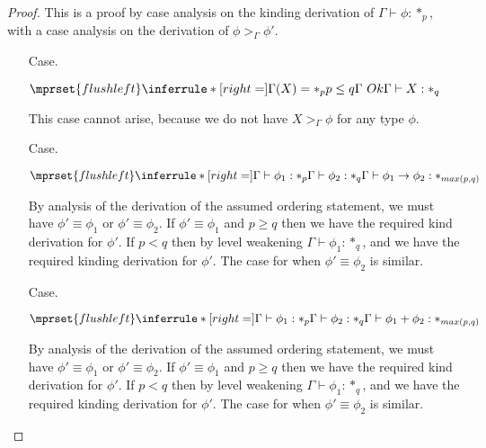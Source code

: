 \begin{proof}
  This is a proof by case analysis on the kinding derivation of 
$\Gamma \vdash \phi:*_p$, with a case analysis on the derivation of 
$\phi >_\Gamma \phi'$.\\

\begin{itemize}
\item[Case.]\ \\
  \begin{center}
    \begin{math}
      $$\mprset{flushleft}
      \inferrule* [right=] {
        \Gamma(X) = *_p
	\\
	p \leq q
	\\
	\Gamma\ Ok
      }{\Gamma \vdash X : *_q}
    \end{math}
  \end{center}
  This case cannot arise, because we do not have $X >_\Gamma \phi$ for any type 
  $\phi$.\\
  
\item[Case.]\ \\
  \begin{center}
    \begin{math}
      $$\mprset{flushleft}
      \inferrule* [right=] {
        \Gamma \vdash \phi_1 : *_p
	\\
	\Gamma \vdash \phi_2 : *_q
      }{\Gamma \vdash \phi_1 \rightarrow \phi_2 : *_{max(p,q)}}
    \end{math}
  \end{center}
  By analysis of the derivation of the assumed ordering statement, we must have 
  $\phi' \equiv \phi_1$ or $\phi' \equiv \phi_2$.  If $\phi' \equiv \phi_1$ and 
  $p \geq q$ then we have the required kind derivation for $\phi'$. If $p < q$ then by 
  level weakening $\Gamma \vdash \phi_1:*_q$, and we have the required kinding 
  derivation for $\phi'$.  The case for when $\phi' \equiv \phi_2$ is similar.\\
  
\item[Case.]\ \\
  \begin{center}
    \begin{math}
      $$\mprset{flushleft}
      \inferrule* [right=] {
        \Gamma \vdash \phi_1 : *_p
	\\
	\Gamma \vdash \phi_2 : *_q
      }{\Gamma \vdash \phi_1 + \phi_2 : *_{max(p,q)}}
    \end{math}
  \end{center}
  By analysis of the derivation of the assumed ordering statement, we must have 
  $\phi' \equiv \phi_1$ or $\phi' \equiv \phi_2$.  If $\phi' \equiv \phi_1$ and 
  $p \geq q$ then we have the required kind derivation for $\phi'$. If $p < q$ then by 
  level weakening $\Gamma \vdash \phi_1:*_q$, and we have the required kinding 
  derivation for $\phi'$.  The case for when $\phi' \equiv \phi_2$ is similar.\\
  

\end{itemize}
\end{proof}
